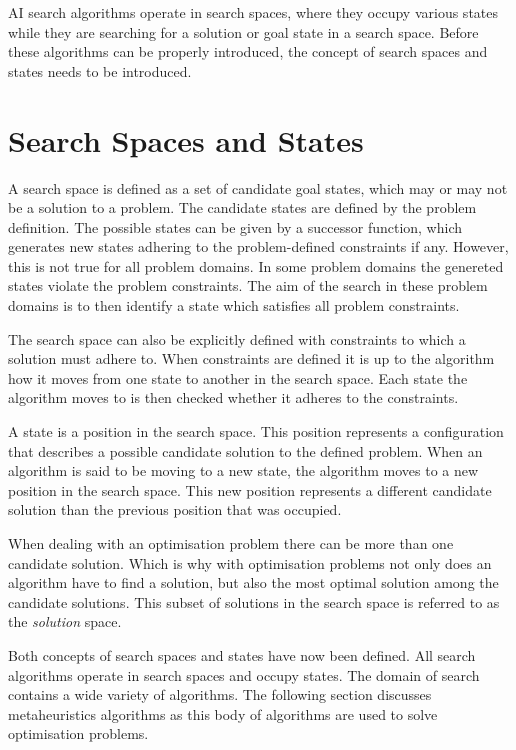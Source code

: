 \gls{AI} search algorithms operate in search spaces, where they occupy various states while they are searching for a solution or goal state in a search space. Before these algorithms can be properly introduced, the concept of search spaces and states needs to be introduced.

\section{Search Spaces and States}
A search space is defined as a set of candidate goal states, which may or may not be a solution to a problem\cite{AIModernApproach}. The candidate states are defined by the problem definition\cite{AIModernApproach}. The possible states can be given by a successor function, which generates new states adhering to the problem-defined constraints if any\cite{AIModernApproach}. However, this is not true for all problem domains. In some problem domains the genereted states violate the problem constraints. The aim of the search in these problem domains is to then identify a state which satisfies all problem constraints.

The search space can also be explicitly defined with constraints to which a solution must adhere to\cite{AIModernApproach}. When constraints are defined it is up to the algorithm how it moves from one state to another in the search space\cite{AIModernApproach}. Each state the algorithm moves to is then checked whether it adheres to the constraints\cite{AIModernApproach}.

A state is a position in the search space\cite{AIModernApproach}. This position represents a configuration that describes a possible candidate solution to the defined problem\cite{AIModernApproach}. When an algorithm is said to be moving to a new state, the algorithm moves to a new position in the search space\cite{AIModernApproach}. This new position represents a different candidate solution than the previous position that was occupied\cite{AIModernApproach}.

When dealing with an optimisation problem there can be more than one candidate solution\cite{AIModernApproach}. Which is why with optimisation problems not only does an algorithm have to find a solution, but also the most optimal solution among the candidate solutions\cite{AIModernApproach}. This subset of solutions in the search space is referred to as the \emph{solution} space.

Both concepts of search spaces and states have now been defined. All search algorithms operate in search spaces and occupy states. The domain of search contains a wide variety of algorithms. The following section discusses metaheuristics algorithms as this body of algorithms are used to solve optimisation problems.

